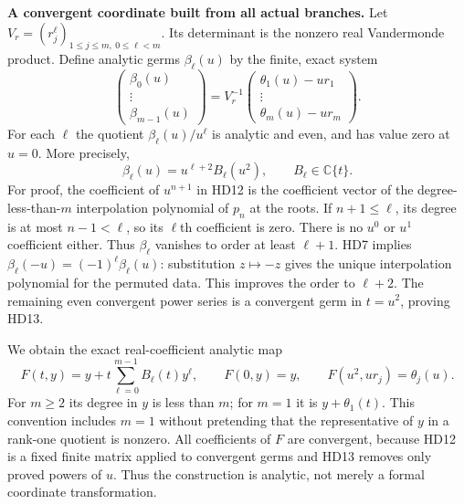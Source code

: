 \HD\textbf{A convergent coordinate built from all actual branches.}
Let $V_r=(r_j^\ell)_{1\le j\le m,\ 0\le\ell<m}$.
Its determinant is the nonzero real Vandermonde product.
Define analytic germs $\beta_\ell(u)$ by the finite, exact system
\[
 \begin{pmatrix}\beta_0(u)\\ \vdots\\ \beta_{m-1}(u)\end{pmatrix}
       =V_r^{-1}
          \begin{pmatrix}\theta_1(u)-ur_1\\
                          \vdots\\\theta_m(u)-ur_m\end{pmatrix}.
 \tag{HD12}\label{hd:finiteinterp}
\]
For each $\ell$ the quotient $\beta_\ell(u)/u^\ell$ is analytic
and even, and has value zero at $u=0$. More precisely,
\[
 \beta_\ell(u)=u^{\ell+2}B_\ell(u^2),\qquad B_\ell\in\mathbb C\{t\}.
 \tag{HD13}\label{hd:divisibility}
\]
For proof, the coefficient of $u^{n+1}$ in HD12 is the coefficient
vector of the degree-less-than-$m$ interpolation polynomial of
$p_n$ at the roots. If $n+1\le\ell$, its degree is at most
$n-1<\ell$, so its $\ell$th coefficient is zero.
There is no $u^0$ or $u^1$ coefficient either.
Thus $\beta_\ell$ vanishes to order at least $\ell+1$.
HD7 implies $\beta_\ell(-u)=(-1)^\ell\beta_\ell(u)$:
substitution $z\mapsto-z$ gives the unique interpolation polynomial
for the permuted data. This improves the order to $\ell+2$.
The remaining even convergent power series is a convergent germ
in $t=u^2$, proving HD13.

We obtain the exact real-coefficient analytic map
\[
 F(t,y)=y+t\sum_{\ell=0}^{m-1}B_\ell(t)y^\ell,\qquad
 F(0,y)=y,\qquad
 F(u^2,ur_j)=\theta_j(u).
 \tag{HD14}\label{hd:F}
\]
For $m\ge2$ its degree in $y$ is less than $m$; for $m=1$ it is
$y+\theta_1(t)$. This convention includes $m=1$ without pretending
that the representative of $y$ in a rank-one quotient is nonzero.
All coefficients of $F$ are convergent, because HD12 is a fixed
finite matrix applied to convergent germs and HD13 removes only
proved powers of $u$. Thus the construction is analytic, not
merely a formal coordinate transformation.

